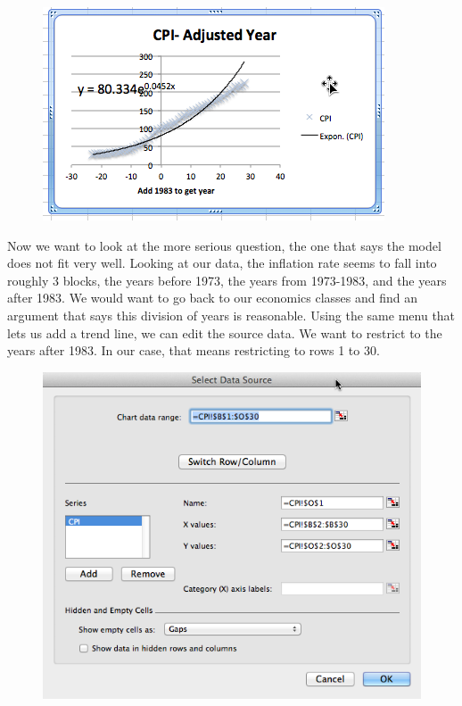 \documentclass[10pt,]{book}
\theoremstyle{plain}
\theoremstyle{definition}
\theoremstyle{definition}
\begin{document}
  \leavevmode%
\begin{figure}
\centering
\includegraphics[width=0.8\linewidth]{images/sec1-5-13.png}
\end{figure}
 

%
\par
Now we want to look at the more serious question, the one that says the model does not fit very well.  Looking at our data, the inflation rate seems to fall into roughly 3 blocks, the years before 1973, the years from 1973-1983, and the years after 1983.  We would want to go back to our economics classes and find an argument that says this division of years is reasonable.  Using the same menu that lets us add a trend line, we can edit the source data.  We want to restrict to the years after 1983.  In our case, that means restricting to rows 1 to 30.

  \leavevmode%
\begin{figure}
\centering
\includegraphics[width=0.8\linewidth]{images/sec1-5-14.png}
\end{figure}
 
\end{document}
